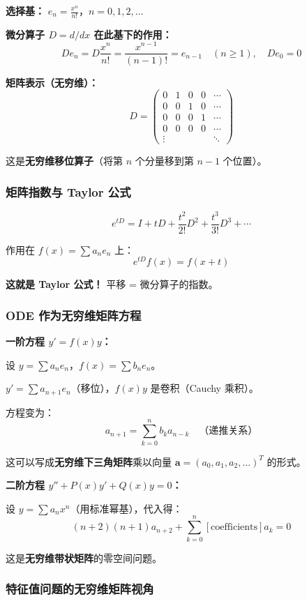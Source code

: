 \textbf{选择基：} $e_n = \frac{x^n}{n!}$，$n = 0, 1, 2, \ldots$

\textbf{微分算子 $D = d/dx$ 在此基下的作用：}
\[
D e_n = D\frac{x^n}{n!} = \frac{x^{n-1}}{(n-1)!} = e_{n-1} \quad (n \geq 1), \quad De_0 = 0
\]

\textbf{矩阵表示（无穷维）：}
\[
D = \begin{pmatrix} 0 & 1 & 0 & 0 & \cdots \\ 0 & 0 & 1 & 0 & \cdots \\ 0 & 0 & 0 & 1 & \cdots \\ 0 & 0 & 0 & 0 & \cdots \\ \vdots & & & & \ddots \end{pmatrix}
\]

这是\textbf{无穷维移位算子}（将第 $n$ 个分量移到第 $n-1$ 个位置）。

\subsubsection{矩阵指数与 Taylor 公式}

\[
e^{tD} = I + tD + \frac{t^2}{2!}D^2 + \frac{t^3}{3!}D^3 + \cdots
\]

作用在 $f(x) = \sum a_n e_n$ 上：
\[
e^{tD}f(x) = f(x + t)
\]

\textbf{这就是 Taylor 公式！} 平移 = 微分算子的指数。

\subsubsection{ODE 作为无穷维矩阵方程}

\textbf{一阶方程 $y' = f(x)y$：}

设 $y = \sum a_n e_n$，$f(x) = \sum b_n e_n$。

$y' = \sum a_{n+1} e_n$（移位），$f(x)y$ 是卷积（Cauchy 乘积）。

方程变为：
\[
a_{n+1} = \sum_{k=0}^n b_k a_{n-k} \quad \text{（递推关系）}
\]

这可以写成\textbf{无穷维下三角矩阵}乘以向量 $\mathbf{a} = (a_0, a_1, a_2, \ldots)^T$ 的形式。

\textbf{二阶方程 $y'' + P(x)y' + Q(x)y = 0$：}

设 $y = \sum a_n x^n$（用标准幂基），代入得：
\[
(n+2)(n+1)a_{n+2} + \sum_{k=0}^n [\text{coefficients}] a_k = 0
\]

这是\textbf{无穷维带状矩阵}的零空间问题。

\subsubsection{特征值问题的无穷维矩阵视角}

